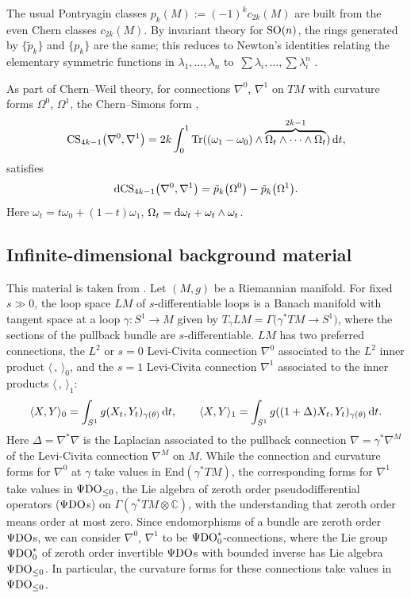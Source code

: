\documentclass[10pt,a4paper]{amsart}
\numberwithin{equation}{section}
\theoremstyle{definition}
\newcommand{\BbC}{{\mathbb C}}
\newcommand{\pdo}{\Psi{\rm DO}}
\newcommand{\C}{\BbC}
\newcommand{\Tr}{{\rm Tr}}
\newcommand{\tp}{\tilde p}
\begin{document}
The usual Pontryagin classes $p_k(M) := (-1)^k c_{2k}(M)$ are built from the even Chern classes $c_{2k}(M)$.
By invariant theory for ${\rm SO}(n)$, the rings generated by $\{\tp_{k}\}$ and
$\{p_{k}\}$ are the same; this reduces to Newton's identities relating the elementary symmetric functions in $\lambda_1,
\dots ,\lambda_n$ to~$\sum \lambda_i,\dots,\sum \lambda_i^n$ \cite[Section~16]{milnor}.

As part of Chern--Weil theory, for connections $\nabla^0$, $\nabla^1$ on $TM$
with curvature forms $\Omega^0$, $\Omega^1$, the Chern--Simons form
,
\[{\rm CS}_{4k-1}\bigl(\nabla^0,\nabla^1\bigr) = 2k\int_0^1 \Tr((\omega_1 - \omega_0)\wedge \overbrace{\Omega_t
\wedge\cdots\wedge\Omega_t}^{2k-1}) \, {\rm d}t,\]
 satisfies
\begin{equation}\label{dcs} {\rm dCS}_{4k-1}\bigl(\nabla^0,\nabla^1\bigr) = \tp_k\bigl(\Omega^0\bigr) - \tp_k\bigl(\Omega^1\bigr).
\end{equation}
Here $\omega_t =t\omega_0+(1-t)\omega_1$, $\Omega_t = {\rm d}\omega_t+\omega_t\wedge\omega_t$.

\subsection{Infinite-dimensional background material}%
This material is taken from \cite{MRT3, MRT4}. Let $(M,g)$ be a Riemannian manifold. For fixed $s\gg 0$, the loop space $LM$ of $s$-differentiable loops is a Banach manifold with tangent space at a loop $\gamma\colon S^1\to M$ given by $T_\gamma LM =\Gamma\bigl(\gamma^*TM\to S^1\bigr)$, where the sections of the pullback bundle are
$s$-differentiable. $LM$
has two preferred connections, the $L^2$ or $s=0$ Levi-Civita connection $\nabla^0$ associated to the $L^2$ inner product $\langle\, ,\, \rangle_0$, and the $s=1$ Levi-Civita connection $\nabla^1$ associated to the inner products
$\langle\, ,\, \rangle_1$:
\[\langle X,Y\rangle_0 = \int_{S^1} g(X_t,Y_t)_{\gamma(\theta)}\, {\rm d}t,\qquad
\langle X,Y\rangle_1 = \int_{S^1} g((1+ \Delta)X_t,Y_t)_{\gamma(\theta)}\, {\rm d}t.\]
Here
$\Delta = \nabla^*\nabla$ is the Laplacian associated to the pullback connection $\nabla = \gamma^*\nabla^M$ of the Levi-Civita connection $\nabla^M$ on $M$. While the connection and curvature forms for $\nabla^0$
at $\gamma$ take values in End$(\gamma^*TM)$, the corresponding forms for $\nabla^1$ take values in
$\pdo_{\leq 0}$, the Lie algebra of zeroth
order
pseudodifferential operators ($\pdo$s) on $\Gamma(\gamma^*TM\otimes \C)$, with the understanding that zeroth order means order at most zero. Since endomorphisms of a bundle are zeroth order $\pdo$s, we can consider $\nabla^0$, $\nabla^1$ to be $\pdo_0^*$-connections, where the Lie group
$\pdo_0^*$ of zeroth order invertible $\pdo$s with bounded inverse has Lie algebra $\pdo_{\leq 0}$.
 In particular, the curvature forms for these connections take values in $\pdo_{\leq 0}$.
\end{document}
